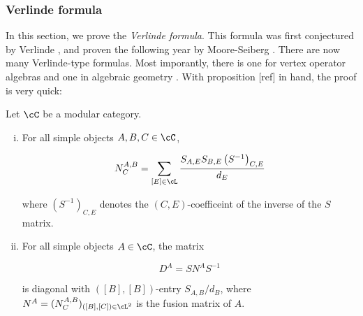 \subsubsection{Verlinde formula}

In this section, we prove the \textit{Verlinde formula}. This formula was first conjectured by Verlinde \cite{verlinde1988fusion}, and proven the following year by Moore-Seiberg \cite{moore1989classical}. There are now many Verlinde-type formulas. Most imporantly, there is one for vertex operator algebras \cite{huang2008vertex} and one in algebraic geometry \cite{faltings1994proof}. With proposition [ref] in hand, the proof is very quick:

\begin{thrm} Let $\cC$ be a modular category.

\begin{enumerate}[(i)]
\item For all simple objects $A,B,C\in \cC$,

$$N^{A,B}_C=\sum_{[E]\in \cL}\frac{S_{A,E}S_{B,E}\left(S^{-1}\right)_{C,E}}{d_E}$$

where $(S^{-1})_{C,E}$ denotes the $(C,E)$-coefficeint of the inverse of the $S$ matrix.

\item For all simple objects $A\in \cC$, the matrix

$$D^A=S N^{A}S^{-1}$$

is diagonal with $([B],[B])$-entry $S_{A,B}/d_B$, where $N^{A}=(N^{A,B}_C)_{([B],[C])\in \cL^2}$ is the fusion matrix of $A$.
\end{enumerate}
\end{thrm}

